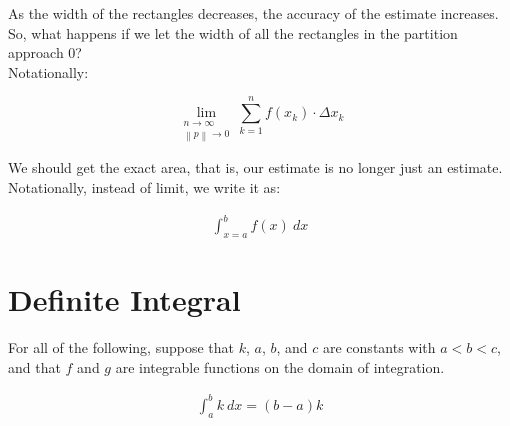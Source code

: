 As the width of the rectangles decreases, the accuracy of the estimate increases. So, what happens if we let the width of all the rectangles in the partition approach 0? \\

Notationally:

$$
    \lim\limits_{\substack{n \rightarrow \infty \\ \left\|p\right\| \rightarrow 0}} \sum_{k=1}^{n} f(x_k) \cdot \Delta x_k
$$

We should get the exact area, that is, our estimate is no longer just an estimate. \\

Notationally, instead of limit, we write it as: \\

\begin{theorem}
    \begin{align}
        \int_{x = a}^{b} f(x) \ dx
    \end{align}
\end{theorem}

\section{Definite Integral}

For all of the following, suppose that $ k $, $ a $, $ b $, and $ c $ are constants with $ a < b < c $, and that $ f $ and $ g $ are integrable functions on the domain of integration. \\

\begin{theorem}
    \begin{align}
        \int_a^b k \ dx = (b - a)k
    \end{align}
\end{theorem}

